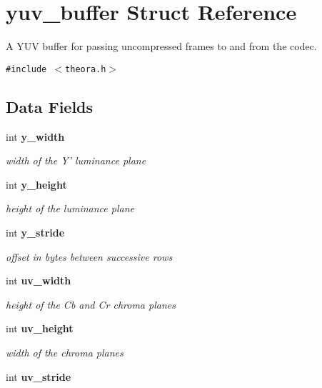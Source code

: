 \section{yuv\_\-buffer Struct Reference}
\label{structyuv__buffer}
A YUV buffer for passing uncompressed frames to and from the codec.  


{\tt \#include $<$theora.h$>$}

\subsection*{Data Fields}
\begin{CompactItemize}
\item 
int {\bf y\_\-width}\label{structyuv__buffer_o0}

\begin{CompactList}\small\item\em width of the Y' luminance plane \item\end{CompactList}\item 
int {\bf y\_\-height}\label{structyuv__buffer_o1}

\begin{CompactList}\small\item\em height of the luminance plane \item\end{CompactList}\item 
int {\bf y\_\-stride}\label{structyuv__buffer_o2}

\begin{CompactList}\small\item\em offset in bytes between successive rows \item\end{CompactList}\item 
int {\bf uv\_\-width}\label{structyuv__buffer_o3}

\begin{CompactList}\small\item\em height of the Cb and Cr chroma planes \item\end{CompactList}\item 
int {\bf uv\_\-height}\label{structyuv__buffer_o4}

\begin{CompactList}\small\item\em width of the chroma planes \item\end{CompactList}\item 
int {\bf uv\_\-stride}\label{structyuv__buffer_o5}


\end{CompactItemize}
